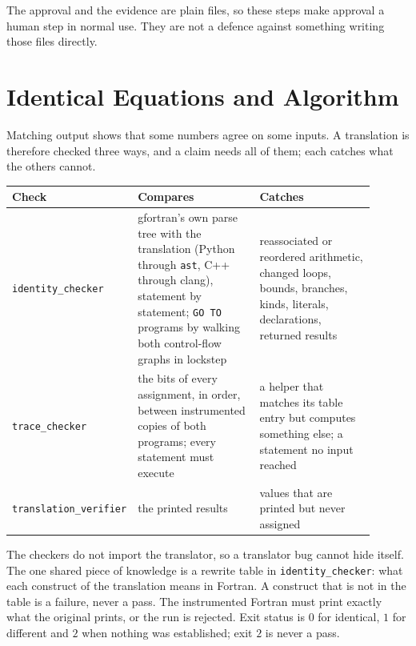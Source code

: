 \documentclass[11pt,a4paper]{article}
\theoremstyle{definition}
\begin{document}
The approval and the evidence are plain files, so these steps make approval a human step in normal use. They are not a defence against something writing those files directly.

\section{Identical Equations and Algorithm}

Matching output shows that some numbers agree on some inputs. A translation is therefore checked three ways, and a claim needs all of them; each catches what the others cannot.

\begin{center}
\begin{tabular}{@{}p{0.2\linewidth}p{0.36\linewidth}p{0.34\linewidth}@{}}
\toprule
Check & Compares & Catches \\
\midrule
\texttt{identity\_checker} & gfortran's own parse tree with the translation (Python through \texttt{ast}, C++ through clang), statement by statement; \texttt{GO TO} programs by walking both control-flow graphs in lockstep & reassociated or reordered arithmetic, changed loops, bounds, branches, kinds, literals, declarations, returned results \\
\texttt{trace\_checker} & the bits of every assignment, in order, between instrumented copies of both programs; every statement must execute & a helper that matches its table entry but computes something else; a statement no input reached \\
\texttt{translation\_verifier} & the printed results & values that are printed but never assigned \\
\bottomrule
\end{tabular}
\end{center}

The checkers do not import the translator, so a translator bug cannot hide itself. The one shared piece of knowledge is a rewrite table in \texttt{identity\_checker}: what each construct of the translation means in Fortran. A construct that is not in the table is a failure, never a pass. The instrumented Fortran must print exactly what the original prints, or the run is rejected. Exit status is $0$ for identical, $1$ for different and $2$ when nothing was established; exit $2$ is never a pass.
\end{document}
